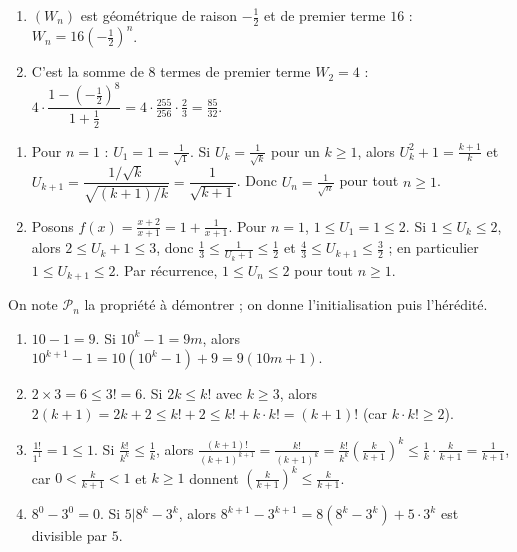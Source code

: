 \begin{corrige}
\begin{sol}
\begin{enumerate}
\begin{enumerate}
      \item $(W_n)$ est g\'eom\'etrique de raison $-\frac{1}{2}$ et de premier terme $16$ : $W_n = 16 \left(-\frac{1}{2}\right)^n$.
      \item C'est la somme de $8$ termes de premier terme $W_2 = 4$ :
            $4 \cdot \dfrac{1 - \left(-\frac{1}{2}\right)^8}{1 + \frac{1}{2}} = 4 \cdot \frac{255}{256} \cdot \frac{2}{3} = \frac{85}{32}$.
      \end{enumerate}
\end{enumerate}
\end{sol}
%
\begin{sol}
\begin{enumerate}
\item Pour $n = 1$ : $U_1 = 1 = \frac{1}{\sqrt{1}}$. Si $U_k = \frac{1}{\sqrt{k}}$ pour un $k \geq 1$, alors
      $U_k^2 + 1 = \frac{k+1}{k}$ et $U_{k+1} = \dfrac{1/\sqrt{k}}{\sqrt{(k+1)/k}} = \dfrac{1}{\sqrt{k+1}}$.
      Donc $U_n = \frac{1}{\sqrt{n}}$ pour tout $n \geq 1$.
\item Posons $f(x) = \frac{x + 2}{x + 1} = 1 + \frac{1}{x+1}$. Pour $n = 1$, $1 \leq U_1 = 1 \leq 2$.
      Si $1 \leq U_k \leq 2$, alors $2 \leq U_k + 1 \leq 3$, donc $\frac{1}{3} \leq \frac{1}{U_k + 1} \leq \frac{1}{2}$ et
      $\frac{4}{3} \leq U_{k+1} \leq \frac{3}{2}$ ; en particulier $1 \leq U_{k+1} \leq 2$.
      Par r\'ecurrence, $1 \leq U_n \leq 2$ pour tout $n \geq 1$.
\end{enumerate}
\end{sol}
%
\begin{sol}
On note $\mathcal{P}_n$ la propri\'et\'e \`a d\'emontrer ; on donne l'initialisation puis l'h\'er\'edit\'e.
\begin{enumerate}
\item $10 - 1 = 9$. Si $10^k - 1 = 9m$, alors $10^{k+1} - 1 = 10(10^k - 1) + 9 = 9(10m + 1)$.
\item $2 \times 3 = 6 \leq 3! = 6$. Si $2k \leq k!$ avec $k \geq 3$, alors $2(k+1) = 2k + 2 \leq k! + 2 \leq k! + k \cdot k! = (k+1)!$
      (car $k \cdot k! \geq 2$).
\item $\frac{1!}{1^1} = 1 \leq 1$. Si $\frac{k!}{k^k} \leq \frac{1}{k}$, alors
      $\frac{(k+1)!}{(k+1)^{k+1}} = \frac{k!}{(k+1)^k} = \frac{k!}{k^k} \left( \frac{k}{k+1} \right)^k \leq \frac{1}{k} \cdot \frac{k}{k+1} = \frac{1}{k+1}$,
      car $0 < \frac{k}{k+1} < 1$ et $k \geq 1$ donnent $\left( \frac{k}{k+1} \right)^k \leq \frac{k}{k+1}$.
\item $8^0 - 3^0 = 0$. Si $5 | 8^k - 3^k$, alors $8^{k+1} - 3^{k+1} = 8(8^k - 3^k) + 5 \cdot 3^k$ est divisible par $5$.

\end{enumerate}
\end{sol}
\end{corrige}
